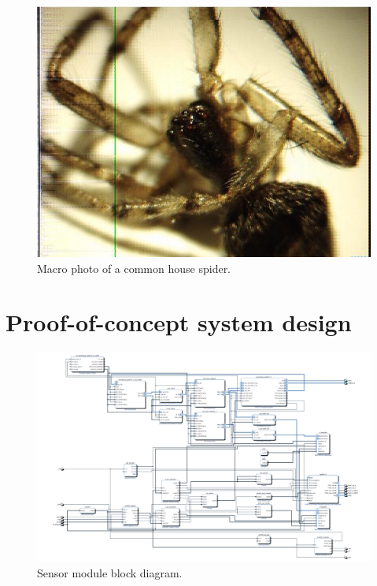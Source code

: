 \begin{appendices}
\begin{figure}
  \centering
  \includegraphics[width=1\textwidth]{./img/ov7670_spider.jpg}
  \caption{Macro photo of a common house spider.}
  \label{fig:ov7670_spider}
\end{figure}

\chapter{Proof-of-concept system design}
\begin{figure}
  \centering
  \includegraphics[width=1\textwidth]{./img/zybo_transmitter.png}
  \caption{Sensor module block diagram.}
  \label{fig:zybo_transmitter}
\end{figure}


\end{appendices}
